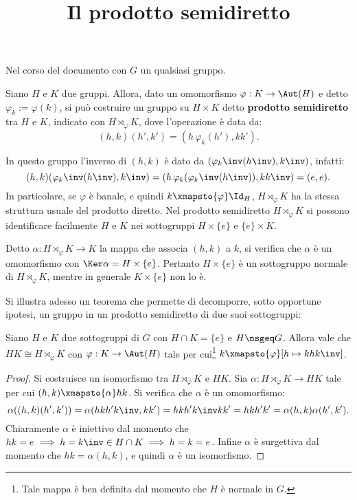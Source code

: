 \documentclass[12pt]{scrartcl}
\begin{document}
	\title{Il prodotto semidiretto}
	\maketitle
	
	\begin{note}
		Nel corso del documento con $G$ un qualsiasi gruppo.
	\end{note}

	Siano $H$ e $K$ due gruppi. Allora, dato un omomorfismo $\varphi : K \to \Aut(H)$ e
	detto $\varphi_k := \varphi(k)$,
	si può costruire un gruppo su $H \times K$ detto \textbf{prodotto semidiretto} tra $H$ e $K$,
	indicato con $H \rtimes_\varphi K$, dove l'operazione è data da:
	\[ (h,k)(h',k') = (h \, \varphi_k(h'), k k'). \]
	
	In questo gruppo l'inverso di $(h, k)$ è dato da $(\varphi_k\inv(h\inv), k\inv)$,
	infatti:
	\[ (h, k) (\varphi_k\inv(h\inv), k\inv) = (h \, \varphi_k(\varphi_k\inv(h\inv)), kk\inv) = (e, e). \]
	In particolare, se $\varphi$ è banale, e quindi $k \xmapsto{\varphi} \Id_H$,
	$H \rtimes_\varphi K$ ha la stessa struttura usuale del prodotto diretto. Nel
	prodotto semidiretto $H \rtimes_\varphi K$ si possono identificare facilmente
	$H$ e $K$ nei sottogruppi $H \times \{e\}$ e $\{e\} \times K$. \medskip
	
	
	Detto $\alpha: H \rtimes_\varphi K \to K$ la mappa che associa $(h, k)$ a
	$k$, si verifica che $\alpha$ è un omomorfismo con $\Ker \alpha = H \times \{e\}$.
	Pertanto $H \times \{e\}$ è un sottogruppo normale di $H \rtimes_\varphi K$,
	mentre in generale $K \times \{e\}$ non lo è. \medskip
	
	
	Si illustra adesso un teorema che permette di decomporre, sotto opportune ipotesi,
	un gruppo in un prodotto semidiretto di due suoi sottogruppi:
	
	\begin{theorem}
		Siano $H$ e $K$ due sottogruppi di $G$ con $H \cap K = \{e\}$ e
		$H \nsgeq G$. Allora vale che $HK \cong H \rtimes_\varphi K$ con
		$\varphi : K \to \Aut(H)$ tale per cui\footnote{
			Tale mappa è ben definita dal momento che $H$ è normale in $G$.
		} $k \xmapsto{\varphi} [h \mapsto k h k\inv]$.
	\end{theorem}
	
	\begin{proof}
		Si costruisce un isomorfismo tra $H \rtimes_\varphi K$ e $HK$. Sia
		$\alpha : H \rtimes_\varphi K \to HK$ tale per cui
		$(h, k) \xmapsto{\alpha} hk$. Si verifica che $\alpha$ è un
		omomorfismo:
		\[ \alpha((h,k)(h',k')) = \alpha(h k h' k\inv, k k') =
			h k h' k\inv k k' = hkh'k' = \alpha(h,k)\alpha(h',k'). \]
		Chiaramente $\alpha$ è iniettivo dal momento che $hk=e \implies h = k\inv \in H \cap K \implies h = k = e$. Infine $\alpha$ è surgettiva dal momento che $hk = \alpha(h, k)$,
		e quindi $\alpha$ è un isomorfismo.
	\end{proof}
\end{document}
